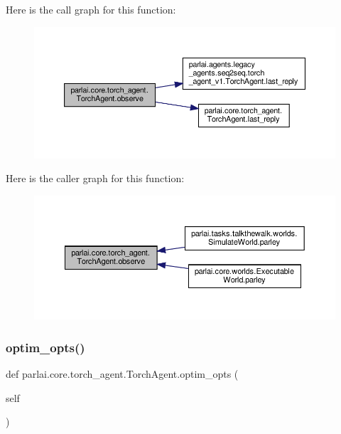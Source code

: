 Here is the call graph for this function\+:
\nopagebreak
\begin{figure}[H]
\begin{center}
\leavevmode
\includegraphics[width=350pt]{classparlai_1_1core_1_1torch__agent_1_1TorchAgent_a87b18f0d6ab11be3c49375af072d0d33_cgraph}
\end{center}
\end{figure}
Here is the caller graph for this function\+:
\nopagebreak
\begin{figure}[H]
\begin{center}
\leavevmode
\includegraphics[width=350pt]{classparlai_1_1core_1_1torch__agent_1_1TorchAgent_a87b18f0d6ab11be3c49375af072d0d33_icgraph}
\end{center}
\end{figure}
\mbox{\label{classparlai_1_1core_1_1torch__agent_1_1TorchAgent_a9c622b8ed5a811841f30fe98cc297cde}} 
\subsubsection{\texorpdfstring{optim\+\_\+opts()}{optim\_opts()}}
{\footnotesize\ttfamily def parlai.\+core.\+torch\+\_\+agent.\+Torch\+Agent.\+optim\+\_\+opts (\begin{DoxyParamCaption}\item[{}]{self }\end{DoxyParamCaption})}

